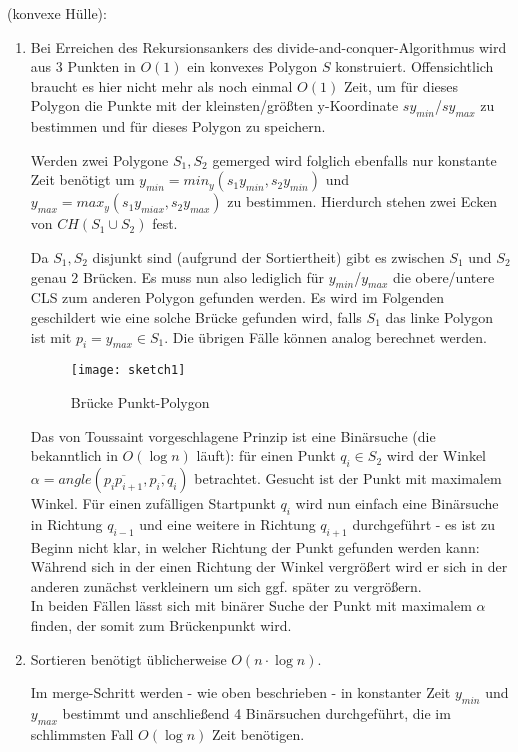 \documentclass[a4paper, titlepage=false, parskip=full-, 10pt]{scrartcl}
\newcounter{tasknbr}
\newenvironment{task}[1]{{\bf Aufgabe \arabic {tasknbr}\stepcounter{tasknbr}} (#1):\begin{enumerate}}{\end{enumerate}}
\newcommand{\subtask}[1]{\item[#1)]}
\begin{document}
\begin{task}{konvexe Hülle}
\subtask{a}
Bei Erreichen des Rekursionsankers des divide-and-conquer-Algorithmus wird aus 3 Punkten in $O(1)$ ein konvexes Polygon $S$ konstruiert. Offensichtlich braucht es hier nicht mehr als noch einmal $O(1)$ Zeit, um für dieses Polygon die Punkte mit der kleinsten/größten y-Koordinate $sy_{min}$/$sy_{max}$ zu bestimmen und für dieses Polygon zu speichern.

Werden zwei Polygone $S_1,S_2$ gemerged wird folglich ebenfalls nur konstante Zeit benötigt um $y_{min}=min_y(s_1y_{min},s_2y_{min})$ und $y_{max}=max_y(s_1y_{miax},s_2y_{max})$ zu bestimmen. Hierdurch stehen zwei Ecken von $CH(S_1\cup S_2)$ fest.

Da $S_1,S_2$ disjunkt sind (aufgrund der Sortiertheit) gibt es zwischen $S_1$ und $S_2$ genau 2 Brücken. Es muss nun also lediglich für $y_{min}$/$y_{max}$ die obere/untere CLS zum anderen Polygon gefunden werden. Es wird im Folgenden geschildert wie eine solche Brücke gefunden wird, falls $S_1$ das linke Polygon ist mit $p_i=y_{max}\in S_1$. Die übrigen Fälle können analog berechnet werden.
\begin{figure}[htpb]
\begin{center}
\texttt{[image: sketch1]}
\end{center}
\caption{Brücke Punkt-Polygon}
\end{figure}

Das von Toussaint vorgeschlagene Prinzip ist eine Binärsuche (die bekanntlich in $O(\log n)$ läuft): für einen Punkt $q_i\in S_2$ wird der  Winkel $\alpha=angle(\overline{p_ip_{i+1}},\overline{p_i,q_i})$ betrachtet. Gesucht ist der Punkt mit maximalem Winkel. Für einen zufälligen Startpunkt $q_i$ wird nun einfach eine Binärsuche in Richtung $q_{i-1}$ und eine weitere in Richtung $q_{i+1}$ durchgeführt - es ist zu Beginn nicht klar, in welcher Richtung der Punkt gefunden werden kann: Während sich in der einen Richtung der Winkel vergrößert wird er sich in der anderen zunächst verkleinern um sich ggf. später zu vergrößern.\\
In beiden Fällen lässt sich mit binärer Suche der Punkt mit maximalem $\alpha$ finden, der somit zum Brückenpunkt wird.

\newpage
\subtask{b}
Sortieren benötigt üblicherweise $O(n\cdot\log n)$.

Im merge-Schritt werden - wie oben beschrieben - in konstanter Zeit $y_{min}$ und $y_{max}$ bestimmt und anschließend 4 Binärsuchen durchgeführt, die im schlimmsten Fall $O(\log n)$ Zeit benötigen.


\end{task}
\end{document}
